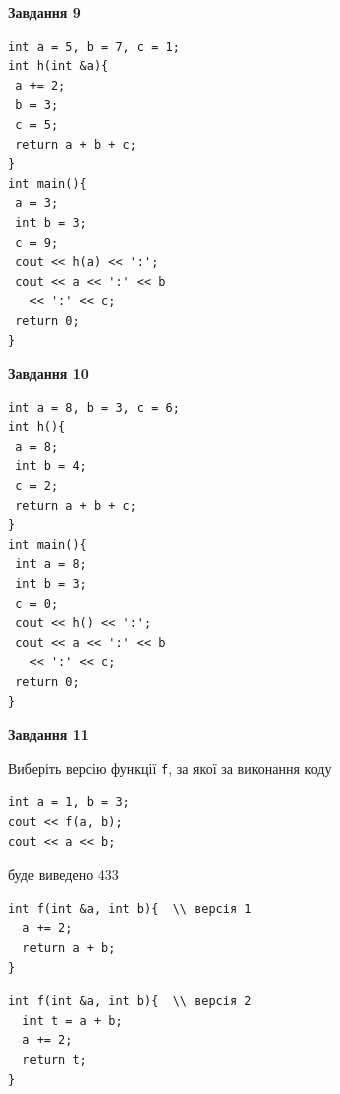 \documentclass[12pt, ukrainian]{article}
\def\code#1{\Verb!#1!}
\begin{document}
{\begin {large}
\begin{minipage}[t]{11.0cm}
\end{minipage}


\begin{minipage}[t]{7.0cm}

\begin{center}
\textbf{Завдання 9}
\end{center}
\vspace{-8mm}

\begin{verbatim}
int a = 5, b = 7, c = 1;
int h(int &a){
 a += 2;
 b = 3;
 c = 5;
 return a + b + c;
}
int main(){
 a = 3;
 int b = 3;
 c = 9;
 cout << h(a) << ':';
 cout << a << ':' << b 
   << ':' << c;
 return 0;
}
\end{verbatim}



\begin{center}
\textbf{Завдання 10}
\end{center}
\vspace{-8mm}

\begin{verbatim}
int a = 8, b = 3, c = 6;
int h(){
 a = 8;
 int b = 4;
 c = 2;
 return a + b + c;
}
int main(){
 int a = 8;
 int b = 3;
 c = 0;
 cout << h() << ':';
 cout << a << ':' << b 
   << ':' << c;
 return 0;
}
\end{verbatim}

\end{minipage}
\vline \hspace{1mm}
\begin{minipage}[t]{11.0cm}

\begin{center}
\textbf{Завдання 11}
\end{center}
Виберіть версію функції \code{f}, за якої за виконання коду
\begin{verbatim}
int a = 1, b = 3;
cout << f(a, b);
cout << a << b;
\end{verbatim}

буде виведено 433

\begin{verbatim}
int f(int &a, int b){  \\ версія 1
  a += 2;
  return a + b;
}
\end{verbatim}

\vspace{-8mm}\begin{verbatim}
int f(int &a, int b){  \\ версія 2
  int t = a + b;
  a += 2;
  return t;
}
\end{verbatim}


\end{minipage}
\end{large}}
\end{document}
